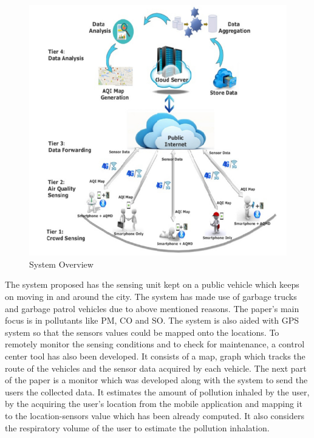 \documentclass[11pt]{article}
\begin{document}
\begin{figure}[h!]
  \centering
  \hspace*{-1.25cm}   
\includegraphics[scale=0.34]{images/fig3.png}
  \hspace*{-1.25cm}
  \caption{System Overview}
  \label{arch}
\end{figure}


 The system proposed has the sensing unit kept on a public vehicle which keeps on moving in and around the city. The system has made use of garbage trucks and garbage patrol vehicles due to above mentioned reasons.
The paper's main focus is in pollutants like PM, CO and SO. The system is also aided with GPS system so that the sensors values could be mapped onto the locations. To remotely monitor the sensing conditions and to check for maintenance, a control center tool has also been developed. It consists of a map, graph which tracks the route of the vehicles and the sensor data acquired by each vehicle. The next part of the paper is a monitor which was developed along with the system to send the users the collected data. It estimates the amount of pollution inhaled by the user, by the acquiring the user's location from the mobile application and mapping it to the location-sensors value which has been already computed. It also considers the respiratory volume of the user to estimate the pollution inhalation.
\end{document}
